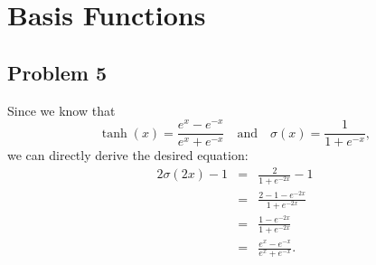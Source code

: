 \section{Basis Functions}

\subsection*{Problem 5}
Since we know that \[\tanh(x) = \frac{e^x - e^{-x}}{e^x + e^{-x}} \quad \textrm{and} \quad \sigma(x) = \frac{1}{1 + e^{-x}},\]
we can directly derive the desired equation:
\begin{eqnarray*}
2\sigma(2x)-1 &=& \frac{2}{1 + e^{-2x}} - 1 \\
              &=& \frac{2 - 1 - e^{-2x}}{1 + e^{-2x}} \\
              &=& \frac{1 - e^{-2x}}{1 + e^{-2x}} \\
              &=& \frac{e^x - e^{-x}}{e^x + e^{-x}}.
\end{eqnarray*}
